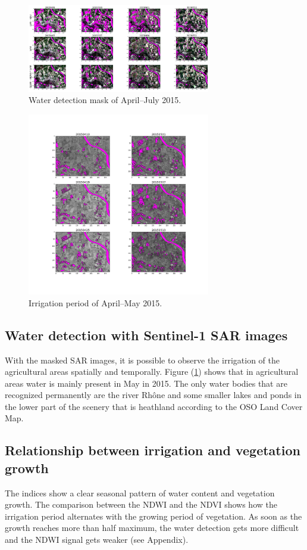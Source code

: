 \documentclass[a4paper, 10pt, conference]{ieeeconf}      %
\begin{document}
\begin{figure}[h]
\centering
\includegraphics[width=8cm]{Figures/Water_detection_mask_2015.png}
\caption{Water detection mask of April–July 2015.}
\label{fig:waterdetection}
\end{figure}

\begin{figure}[h]
\centering
\includegraphics[width=8cm]{Figures/Irrigation_Period_2015.png}
\caption{Irrigation period of April–May 2015.}
\label{fig:irrigation2015}
\end{figure}

\subsection{Water detection with Sentinel-1 SAR images}

With the masked SAR images, it is possible to observe the irrigation of the agricultural areas spatially and temporally. Figure (\ref{fig:waterdetection}) shows that in agricultural areas water is mainly present in May in 2015. The only water bodies that are recognized permanently are the river Rhône and some smaller lakes and ponds in the lower part of the scenery that is heathland according to the OSO Land Cover Map.

\subsection{Relationship between irrigation and vegetation growth}
The indices show a clear seasonal pattern of water content and vegetation growth. The comparison between the NDWI and the NDVI shows how the irrigation period alternates with the growing period of vegetation. As soon as the growth reaches more than half maximum, the water detection gets more difficult and the NDWI signal gets weaker (see Appendix).
\end{document}
